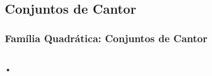\subsection{Conjuntos de Cantor}

\begin{frame}
\vspace{5pt}
\frametitle{Família Quadrática: Conjuntos de Cantor}
\begin{columns}
\column{\dimexpr\paperwidth-15pt}

•

\end{columns}
\end{frame}

